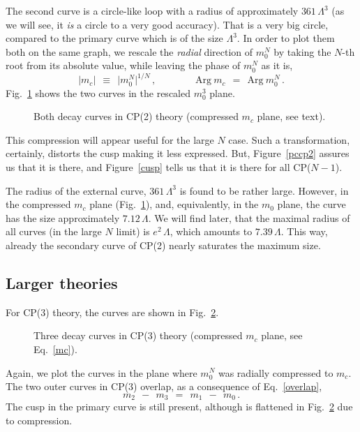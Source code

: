 \documentclass[epsfig,12pt]{article}
\def\beq{\begin{equation}}
\def\eeq{\end{equation}}
\def\beq{\begin{equation}}
\def\eeq{\end{equation}}
\begin{document}
	The second curve is a circle-like loop with a radius of approximately $ 361\, \Lambda^3 $ 
	(as we will see, it {\it is} a circle to a very good accuracy).
	That is a very big circle, compared to the primary curve which is of the size $ \Lambda^3 $.
	In order to plot them both on the same graph, we rescale the {\it radial} direction of 
	$ m_0^N $ by taking the $ N $-th root from its absolute value, while leaving the 
	phase of $ m_0^N $ as it is, 
\beq
\label{mc}
	\big| m_c \big| ~~\equiv~~ \big| m_0^N \big|^{1/N} \,, \qquad\qquad \text{Arg}\:m_c ~~=~~ \text{Arg}\: m_0^N\,.
\eeq
	Fig.~\ref{ccp2} shows the two curves in the rescaled $ m_0^3 $ plane.
\begin{figure}
\begin{center}
\epsfxsize=7.5cm
\caption{Both decay curves in CP(2) theory (compressed $ m_c $ plane, see text).} 
\label{ccp2}
\end{center}
\end{figure}
	This compression will appear useful for the large $ N $ case.
	Such a transformation, certainly, distorts the cusp making it less expressed.
	But, Figure~\ref{pccp2} assures us that it is there, and Figure~\ref{cusp} tells us that
	it is there for all CP($N-1$).

	The radius of the external curve, $ 361\, \Lambda^3 $ is found to be rather large.
	However, in the compressed $ m_c $ plane (Fig.~\ref{ccp2}), and, equivalently, in the $ m_0 $ plane, 
	the curve has the size approximately $ 7.12\, \Lambda $. 
	We will find later, that the maximal radius of all curves (in the large $ N $ limit)
	is $ e^2 \, \Lambda $, which amounts to $ 7.39\, \Lambda $.
	This way, already the secondary curve of CP(2) nearly saturates the maximum size.
	

\subsection{Larger  theories}

	For CP(3) theory, the curves are shown in Fig.~\ref{ccp3}.
\begin{figure}
\begin{center}
\epsfxsize=7.5cm
\caption{\small Three decay curves in CP(3) theory (compressed $ m_c $ plane, see Eq.~\eqref{mc}).} 
\label{ccp3}
\end{center}
\end{figure}
	Again, we plot the curves in the plane where $ m_0^N $ was radially compressed to $ m_c $.
	The two outer curves in CP(3) overlap, as a consequence of Eq.~\eqref{overlap},
\beq
	m_2 ~~-~~ m_3  ~~=~~ m_1 ~~-~~ m_0\,.
\eeq
	The cusp in the primary curve is still present, although is flattened in Fig.~\ref{ccp3} due to compression.
\end{document}
